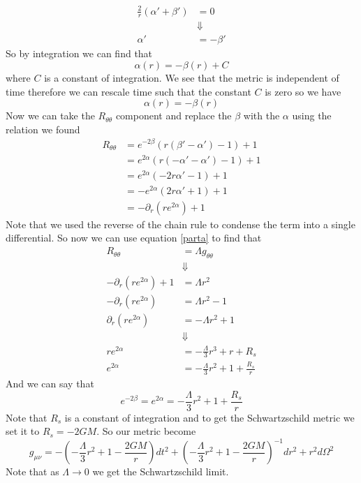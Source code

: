 \documentclass[11pt]{article}
\numberwithin{equation}{section}
\begin{document}
\begin{enumerate}[(a)]
\begin{align*}
\frac{2}{r}(\alpha'+\beta') &= 0\\
&\Downarrow\\
\alpha' &= -\beta'
\end{align*}
So by integration we can find that 
$$\alpha(r) = -\beta(r) + C$$
where $C$ is a constant of integration. We see that the metric is independent of time therefore we can rescale time such that the constant $C$ is zero so we have
$$\alpha(r) = -\beta(r) $$
Now we can take the $R_{\theta\theta}$ component and replace the $\beta$ with the $\alpha$ using the relation we found
\begin{align*}
R_{\theta\theta} &= e^{-2\beta}\left(r(\beta'-\alpha')-1\right)+1\\
&= e^{2\alpha}\left(r(-\alpha'-\alpha')-1\right)+1\\
&= e^{2\alpha}\left(-2r\alpha'-1\right)+1\\
&= -e^{2\alpha}\left(2r\alpha' + 1\right)+1\\
&= -\partial_r\left(re^{2\alpha}\right)+1
\end{align*}
Note that we used the reverse of the chain rule to condense the term into a single differential. So now we can use equation \ref{parta} to find that
\begin{align*}
R_{\theta\theta} &= \Lambda g_{\theta\theta}\\
&\Downarrow\\
-\partial_r\left(re^{2\alpha}\right)+1 &= \Lambda r^2\\
-\partial_r\left(re^{2\alpha}\right) &= \Lambda r^2 - 1\\
\partial_r\left(re^{2\alpha}\right) &= -\Lambda r^2 + 1\\
&\Downarrow\\
re^{2\alpha} &= -\frac{\Lambda}{3}r^3 + r + R_s\\
e^{2\alpha} &= -\frac{\Lambda}{3}r^2 + 1 + \frac{R_s}{r}
\end{align*}
And we can say that
$$e^{-2\beta} = e^{2\alpha} = -\frac{\Lambda}{3}r^2 + 1 +\frac{R_s}{r}$$
Note that $R_s$ is a constant of integration and to get the Schwartzschild metric we set it to $R_s = -2GM$. So our metric become
$$g_{\mu\nu} = -\left(-\frac{\Lambda}{3}r^2 + 1 - \frac{2GM}{r}\right)dt^2 + \left(-\frac{\Lambda}{3}r^2 + 1 - \frac{2GM}{r}\right)^{-1}dr^2 + r^2d\Omega^2$$
Note that as $\Lambda\rightarrow 0$ we get the Schwartzschild limit.


\end{enumerate}
\end{document}
